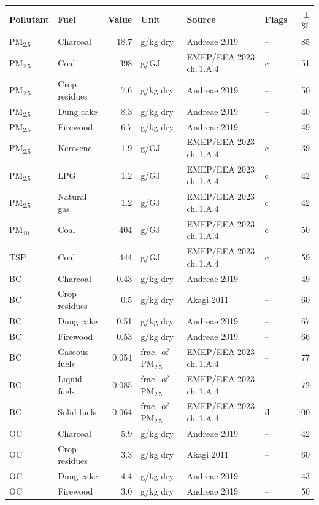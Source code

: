 \begin{table}[htbp]
\centering
\scriptsize
\begin{tabular}{@{}llrlllr@{}}
\toprule
\textbf{Pollutant} & \textbf{Fuel} & \textbf{Value} & \textbf{Unit} & \textbf{Source} & \textbf{Flags} & \textbf{$\pm$\%} \\
\midrule
PM$_{2.5}$ & Charcoal & 18.7 & g/kg dry & Andreae 2019 & -- & 85 \\
PM$_{2.5}$ & Coal & 398 & g/GJ & EMEP/EEA 2023 ch.\,1.A.4 & c & 51 \\
PM$_{2.5}$ & Crop residues & 7.6 & g/kg dry & Andreae 2019 & -- & 50 \\
PM$_{2.5}$ & Dung cake & 8.3 & g/kg dry & Andreae 2019 & -- & 40 \\
PM$_{2.5}$ & Firewood & 6.7 & g/kg dry & Andreae 2019 & -- & 49 \\
PM$_{2.5}$ & Kerosene & 1.9 & g/GJ & EMEP/EEA 2023 ch.\,1.A.4 & c & 39 \\
PM$_{2.5}$ & LPG & 1.2 & g/GJ & EMEP/EEA 2023 ch.\,1.A.4 & c & 42 \\
PM$_{2.5}$ & Natural gas & 1.2 & g/GJ & EMEP/EEA 2023 ch.\,1.A.4 & c & 42 \\
PM$_{10}$ & Coal & 404 & g/GJ & EMEP/EEA 2023 ch.\,1.A.4 & c & 50 \\
TSP & Coal & 444 & g/GJ & EMEP/EEA 2023 ch.\,1.A.4 & c & 59 \\
BC & Charcoal & 0.43 & g/kg dry & Andreae 2019 & -- & 49 \\
BC & Crop residues & 0.5 & g/kg dry & Akagi 2011 & -- & 60 \\
BC & Dung cake & 0.51 & g/kg dry & Andreae 2019 & -- & 67 \\
BC & Firewood & 0.53 & g/kg dry & Andreae 2019 & -- & 66 \\
BC & Gaseous fuels & 0.054 & frac.\ of PM$_{2.5}$ & EMEP/EEA 2023 ch.\,1.A.4 & -- & 77 \\
BC & Liquid fuels & 0.085 & frac.\ of PM$_{2.5}$ & EMEP/EEA 2023 ch.\,1.A.4 & -- & 72 \\
BC & Solid fuels & 0.064 & frac.\ of PM$_{2.5}$ & EMEP/EEA 2023 ch.\,1.A.4 & d & 100 \\
OC & Charcoal & 5.9 & g/kg dry & Andreae 2019 & -- & 42 \\
OC & Crop residues & 3.3 & g/kg dry & Akagi 2011 & -- & 60 \\
OC & Dung cake & 4.4 & g/kg dry & Andreae 2019 & -- & 43 \\
OC & Firewood & 3.0 & g/kg dry & Andreae 2019 & -- & 50 \\

\end{tabular}
\end{table}
